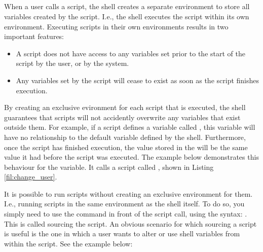 \subsection{}

When a user calls a script, the shell creates a separate environment to store all variables created by the script. I.e., the shell executes the script within its own environment. Executing scripts in their own environments results in two important features:
\begin{itemize}
\item A script does not have access to any variables set prior to the start of the script by the user, or by the system.
\item Any variables set by the script will cease to exist as soon as the script finishes execution.
\end{itemize}

By creating an exclusive evironment for each script that is executed, the shell guarantees that scripts will not accidently overwrite any variables that exist outside them. For example, if a script defines a variable called , this variable will have no relationship to the default  variable defined by the shell. Furthermore, once the script has finished execution, the value stored in the  will be the same value it had before the script was executed. The example below demonstrates this behaviour for the  variable. It calls a script called , shown in Listing \ref{fil:change_user}.





It is possible to run scripts without creating an exclusive environment for them. I.e., running scripts in the same environment as the shell itself. To do so, you simply need to use the  command in front of the script call, using the syntax: . This is called sourcing the script. An obvious scenario for which sourcing a script is useful is the one in which a user wants to alter or use shell variables from within the script. See the example below:

